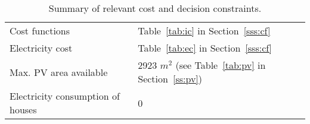 \begin{table}[htp]
	\centering
	\caption{Summary of relevant cost and decision constraints.}
	\label{tab:cc_cu}
	\begin{tabular}{ll}
		\toprule
		Cost functions         & Table~\ref{tab:ic} in Section~\ref{sss:cf}         \\
		Electricity cost       & Table~\ref{tab:ec} in Section~\ref{sss:cf}       \\
		Max. PV area available & 2923 $m^2$ (see Table~\ref{tab:pv} in Section~\ref{ss:pv})\\
		Electricity consumption of houses	 & 0 \\ 
		\bottomrule
	\end{tabular}
\end{table}